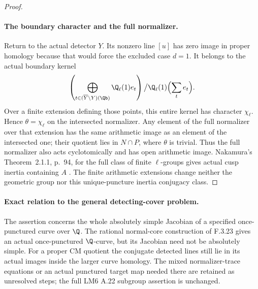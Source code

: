 \begin{proof}
\paragraph{The boundary character and the full normalizer.}
Return to the actual detector $Y$. Its nonzero
line $[u]$ has zero image in proper homology
because that would force the excluded case
$d=1$. It belongs to the actual boundary kernel
\[
 \left(\bigoplus_{t\in(\overline Y\setminus Y)(\Qb)}
          \Q_\ell(1)e_t\right)
 \big/\Q_\ell(1)\Bigl(\sum_t e_t\Bigr).
\]
Over a finite extension defining those points,
this entire kernel has character $\chi_\ell$.
Hence $\theta=\chi_\ell$ on the intersected
normalizer. Any element of the full normalizer
over that extension has the same arithmetic
image as an element of the intersected one;
their quotient lies in $N\cap P$, where
$\theta$ is trivial. Thus the full normalizer
also acts cyclotomically and has open arithmetic
image. Nakamura's Theorem~2.1.1, p.~94, for
the full class of finite $\ell$-groups gives
actual cusp inertia containing $A$
\cite{AuditNakamura1994}. The finite arithmetic
extensions change neither the geometric group
nor this unique-puncture inertia conjugacy class.
\end{proof}

\paragraph{Exact relation to the general detecting-cover problem.}
The assertion concerns the whole absolutely simple
Jacobian of a specified once-punctured curve over
$\Q$. The rational normal-core construction of
F.3.23 gives an actual once-punctured $\Q$-curve,
but its Jacobian need not be absolutely simple.
For a proper CM quotient the conjugate detected
lines still lie in its actual images inside the
larger curve homology. The mixed normalizer-trace
equations or an actual punctured target map
needed there are retained as unresolved steps;
the full LM6 A.22 subgroup assertion is unchanged.
